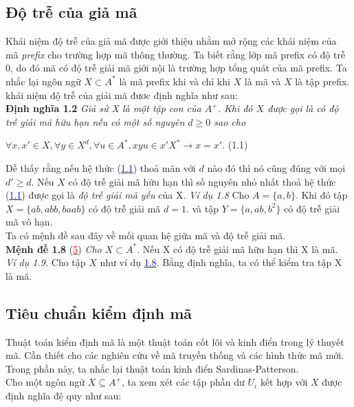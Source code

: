 \begin{flushleft}
\subsection{Độ trễ của giả mã}
Khái niệm độ trễ của giả mã được giới thiệu nhằm mở rộng các khái niệm của mã \textit{prefix} cho trường hợp mã thông thường. Ta biết rằng lớp mã prefix có độ trễ 0, do đó mã có độ trễ giải mã giới nội là trường hợp tổng quát của mã prefix. Ta nhắc lại ngôn ngữ $X \subset A^*$ là mã prefix khi và chỉ khi $X$ là mã và $X$ là tập prefix. khái niệm độ trễ của giải mã đươc định nghĩa như sau: \\
\textbf{Định nghĩa 1.2}\text{   } \textit{Giả sử X là một tập con của $A^+$. Khi đó $X$ được gọi là có độ trễ giải mã hữu hạn nếu có một số nguyên $d \ge 0$ sao cho }  
\end{flushleft}
$\forall x, x' \in X , \forall y \in X^d , \forall u \in A^* , xyu \in x'X^* \rightarrow x = x'$. (1.1)
\begin{flushleft}
\hspace{10mm}Dễ thấy rằng nếu hệ thức (\hyperlink{page.21}{\textcolor{blue}{1.1}}) thoả mãn với $d$ nào đó thì nó cũng đúng với mọi $d' \ge d$. Nếu $X$ có độ trễ giải mã hữu hạn thì số nguyên nhỏ nhất thoả hệ thức (\hyperlink{page.21}{\textcolor{blue}{1.1}}) được gọi là \textit{độ trễ giải mã yếu} của X. 
\textit{Ví dụ 1.8}  Cho $A = \{ a,b \}$. Khi đó tập $X = \{ ab, abb, baab \}$ có độ trễ giải mã $d = 1$. và tập $Y = \{ a, ab, b^2 \}$ có độ trễ giải mã vô hạn.\\
\hspace{10mm}Ta có mệnh đề sau đây về mối quan hệ giữa mã và độ trễ giải mã. \\
\textbf{Mệnh đề 1.8} (\hyperlink{page.81}{\textcolor{red}{5}}) \textit{Cho $X \subset A^*$}. Nếu X có độ trễ giải mã hữu hạn thì X là mã.\\
\textit{Ví dụ 1.9.} Cho tập $X$ như ví dụ \hyperlink{page.21}{\textcolor{blue}{1.8}}. Bằng định nghĩa, ta có thể kiểm tra tập X là mã. \\
\subsection{Tiêu chuẩn kiểm định mã}
Thuật toán kiểm định mã là một thuật toán cốt lõi và kinh điển trong lý thuyết mã. Cần thiết cho các nghiên cứu về mã truyền thống và các hình thức mã mới. Trong phần này, ta nhắc lại thuật toán kinh điển Sardinas-Patterson.\\
\hspace{10mm}Cho một ngôn ngữ $X \subseteq A^+$, ta xem xét các tập phần dư $U_i$ kết hợp với $X$ được định nghĩa đệ quy như sau:
\end{flushleft} 

